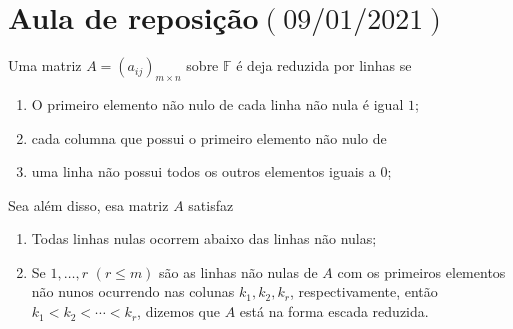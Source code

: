 \chapter{Aula de reposição\quad$\left(09/01/2021\right)$}

\begin{definition}
  Uma matriz $A={\left(a_{ij}\right)}_{m\times n}$ sobre $\mathbb{F}$
  é deja reduzida por linhas se
  \begin{enumerate}
    \item

          O primeiro elemento não nulo de cada linha não nula é
          igual $1$;

    \item

          cada columna que possui o primeiro elemento não nulo de

    \item

          uma linha não possui todos os outros elementos iguais a
          $0$;
  \end{enumerate}


  Sea além disso, esa matriz $A$ satisfaz

  \begin{enumerate}

    \item

          Todas linhas nulas ocorrem abaixo das linhas não nulas;

    \item

          Se $1,\ldots,r$ $\left(r\leq m\right)$ são as linhas não
          nulas de $A$ com os primeiros elementos não nunos ocurrendo
          nas colunas $k_{1},k_{2},k_{r}$, respectivamente, então
          $k_{1}<k_{2}<\cdots<k_{r}$, dizemos que $A$ está na forma
          escada reduzida.
  \end{enumerate}
\end{definition}

